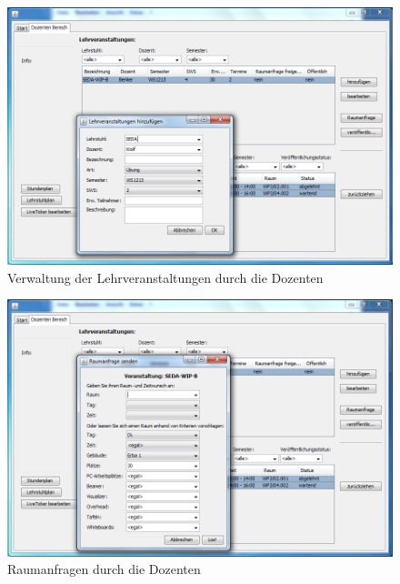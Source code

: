 \begin{figure}[H]
\begin{center}
\includegraphics[width=150mm]{images/section_7/DozentenLehrveranstaltungenHinzufuegen.PNG}
\caption{Verwaltung der Lehrveranstaltungen durch die Dozenten}
\label{img:LehrveranstaltungsVerwDoz}
\end{center}
\end{figure}



\begin{figure}[H]
\begin{center}
\includegraphics[width=150mm]{images/section_7/DozentenRaumanfrage.PNG}
\caption{Raumanfragen durch die Dozenten}
\label{img:RaumanfrageDoz}
\end{center}
\end{figure}


